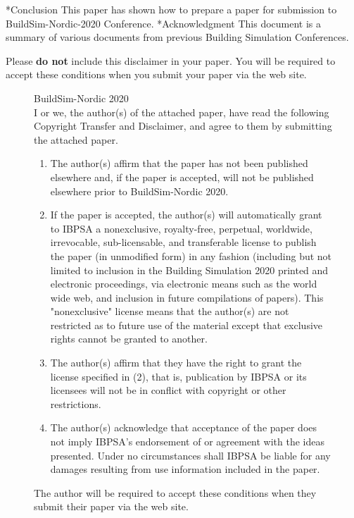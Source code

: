 \documentclass[twocolumn, a4paper,10pt]{article}
\makeatletter
\renewcommand\section{\@startsection{section}{1}{\z@}{3pt}{3pt}{\normalfont\large\bfseries}}
\makeatother
\begin{document}
\section*{Conclusion}
This paper has shown how to prepare a paper for submission to BuildSim-Nordic-2020 Conference.  
\section*{Acknowledgment}
This document is a summary of various documents from previous Building Simulation Conferences.


\newpage
\onecolumn
Please \textbf{do not} include this disclaimer in your paper.  You will be required to accept these conditions when you  submit your paper via the web site.

\begin{figure}[ht]
\centering
\begin{boxedminipage}{\textwidth}
BuildSim-Nordic 2020\\

I or we, the author(s) of the attached paper, have read the following Copyright Transfer and Disclaimer, and agree to them by submitting the attached paper.
\begin{enumerate}
\item
The author(s) affirm that the paper has not been published elsewhere and, if the paper is accepted, will not be published elsewhere prior to BuildSim-Nordic 2020.
\item
If the paper is accepted, the author(s) will automatically grant to IBPSA a nonexclusive, royalty-free, perpetual, worldwide, irrevocable, sub-licensable, and transferable license to publish the paper (in unmodified form) in any fashion (including but not limited to inclusion in the Building Simulation 2020 printed and electronic proceedings, via electronic means such as the world wide web, and inclusion in future compilations of papers).  This "nonexclusive" license means that the author(s) are not restricted as to future use of the material except that exclusive rights cannot be granted to another.
\item
The author(s) affirm that they have the right to grant the license specified in (2), that is, publication by IBPSA or its licensees will not be in conflict with copyright or other restrictions.
\item
The author(s) acknowledge that acceptance of the paper does not imply IBPSA's endorsement of or agreement with the ideas presented.  Under no circumstances shall IBPSA be liable for any damages resulting from use information included in the paper.
\end{enumerate}
\end{boxedminipage}
\caption{The author will be required to accept these conditions when they submit their paper via the web site.}
\label{fig:fig02}
\end{figure}
\end{document}
